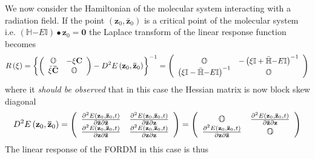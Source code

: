 \documentclass[aps,preprint]{revtex4}%
\begin{document}
We now consider the Hamiltonian of the molecular system interacting with a
radiation field. If the point $\left(  \mathbf{z}_{0},\mathbf{\bar{z}}%
_{0}\right)  $ is a critical point of the molecular system i.e. $\left(
\mathbb{H}\mathbf{-}E\mathbb{I}\right)  \bullet\mathbf{z}_{0}=\mathbf{0}$ the
Laplace transform of the linear response function becomes%
\begin{equation}
R\left(  \xi\right)  =\left\{  \left(
\begin{array}
[c]{cc}%
\mathbb{O} & -\xi\mathbf{C}\\
\bar{\xi}\mathbf{\bar{C}} & \mathbb{O}%
\end{array}
\right)  -D^{2}E\left(  \mathbf{z}_{0},\mathbf{\bar{z}}_{0}\right)  \right\}
^{-1}=\left(
\begin{array}
[c]{cc}%
\mathbb{O} & -\left(  \xi\mathbb{I+\bar{H}}\mathbf{-}E\mathbb{I}\right)
^{-1}\\
\left(  \xi\mathbb{I-\bar{H}}\mathbf{-}E\mathbb{I}\right)  ^{-1} & \mathbb{O}%
\end{array}
\right)
\end{equation}
where it \emph{should be observed }that in this case the Hessian matrix is now
block skew diagonal%
\begin{equation}
D^{2}E\left(  \mathbf{z}_{0},\mathbf{\bar{z}}_{0}\right)  =\left(
\begin{array}
[c]{cc}%
\frac{\partial^{2}E\left(  \mathbf{z}_{0},\mathbf{\bar{z}}_{0},t\right)
}{\partial\mathbf{\bar{z}}\partial\mathbf{\bar{z}}} & \frac{\partial
^{2}E\left(  \mathbf{z}_{0},\mathbf{\bar{z}}_{0},t\right)  }{\partial
\mathbf{\bar{z}}\partial\mathbf{z}}\\
\frac{\partial^{2}E\left(  \mathbf{z}_{0},\mathbf{\bar{z}}_{0},t\right)
}{\partial\mathbf{z}\partial\mathbf{\bar{z}}} & \frac{\partial^{2}E\left(
\mathbf{z}_{0},\mathbf{\bar{z}}_{0},t\right)  }{\partial\mathbf{z}%
\partial\mathbf{z}}%
\end{array}
\right)  =\left(
\begin{array}
[c]{cc}%
\mathbb{O} & \frac{\partial^{2}E\left(  \mathbf{z}_{0},\mathbf{\bar{z}}%
_{0},t\right)  }{\partial\mathbf{\bar{z}}\partial\mathbf{z}}\\
\frac{\partial^{2}E\left(  \mathbf{z}_{0},\mathbf{\bar{z}}_{0},t\right)
}{\partial\mathbf{z}\partial\mathbf{\bar{z}}} & \mathbb{O}%
\end{array}
\right)
\end{equation}
The linear response of the FORDM in this case is thus%
\end{document}
